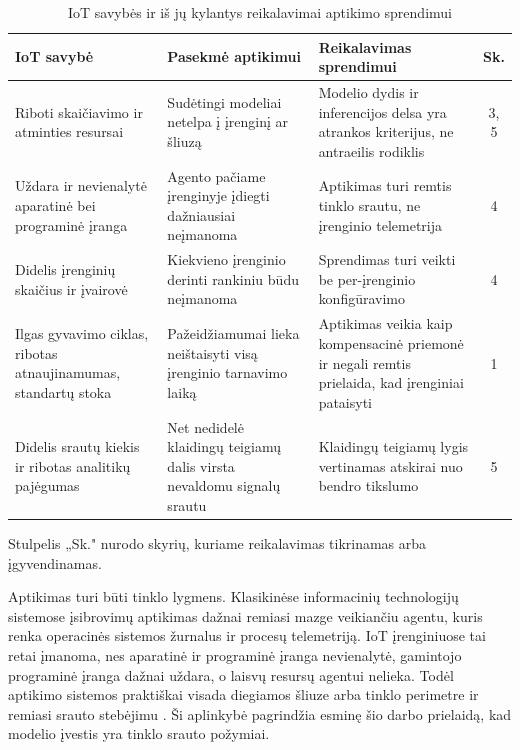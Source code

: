 \begin{table}[htbp]
\centering
\caption{IoT savybės ir iš jų kylantys reikalavimai aptikimo sprendimui}
\label{tab:reikalavimai}
\footnotesize
\setlength{\tabcolsep}{4pt}
\begin{tabularx}{\textwidth}{@{}
  >{\raggedright\arraybackslash}p{3.2cm}
  >{\raggedright\arraybackslash}X
  >{\raggedright\arraybackslash}X
  c@{}}
\toprule
\textbf{IoT savybė} & \textbf{Pasekmė aptikimui}
  & \textbf{Reikalavimas sprendimui} & \textbf{Sk.} \\
\midrule

Riboti skaičiavimo ir atminties resursai
  & Sudėtingi modeliai netelpa į įrenginį ar šliuzą
  & Modelio dydis ir inferencijos delsa yra atrankos kriterijus, ne
    antraeilis rodiklis
  & 3, 5 \\
\addlinespace

Uždara ir nevienalytė aparatinė bei programinė įranga
  & Agento pačiame įrenginyje įdiegti dažniausiai neįmanoma
  & Aptikimas turi remtis tinklo srautu, ne įrenginio telemetrija
  & 4 \\
\addlinespace

Didelis įrenginių skaičius ir įvairovė
  & Kiekvieno įrenginio derinti rankiniu būdu neįmanoma
  & Sprendimas turi veikti be per-įrenginio konfigūravimo
  & 4 \\
\addlinespace

Ilgas gyvavimo ciklas, ribotas atnaujinamumas, standartų stoka
  & Pažeidžiamumai lieka neištaisyti visą įrenginio tarnavimo laiką
  & Aptikimas veikia kaip kompensacinė priemonė ir negali remtis
    prielaida, kad įrenginiai pataisyti
  & 1 \\
\addlinespace

Didelis srautų kiekis ir ribotas analitikų pajėgumas
  & Net nedidelė klaidingų teigiamų dalis virsta nevaldomu signalų
    srautu
  & Klaidingų teigiamų lygis vertinamas atskirai nuo bendro tikslumo
  & 5 \\
\bottomrule
\end{tabularx}

\vspace{2pt}
\raggedright\footnotesize
Stulpelis „Sk." nurodo skyrių, kuriame reikalavimas tikrinamas arba
įgyvendinamas.
\normalsize
\end{table}

Aptikimas turi būti tinklo lygmens. Klasikinėse
informacinių technologijų sistemose įsibrovimų aptikimas dažnai
remiasi mazge veikiančiu agentu, kuris renka operacinės sistemos
žurnalus ir procesų telemetriją. IoT įrenginiuose tai retai
įmanoma, nes aparatinė ir programinė įranga nevienalytė, gamintojo
programinė įranga dažnai uždara, o laisvų resursų agentui
nelieka. Todėl aptikimo sistemos praktiškai visada diegiamos šliuze
arba tinklo perimetre ir remiasi srauto stebėjimu
\cite{komal2026idsreview,fei2023systematic}. Ši aplinkybė pagrindžia
esminę šio darbo prielaidą, kad modelio įvestis yra tinklo srauto požymiai.

